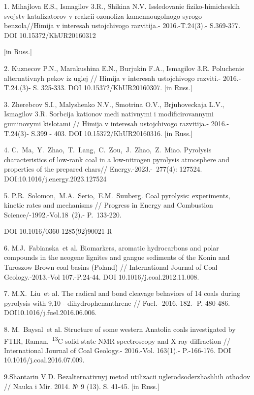 \begin{noparindent}
1. Mihajlova E.S., Ismagilov 3.R., Shikina N.V. Issledovanie
fiziko-himicheskih svojstv katalizatorov v reakcii ozonoliza
kamennougol\textquotesingle nogo syrogo benzola//Himija v interesah
ustojchivogo razvitija.- 2016.-T.24(3).- S.369-377. DOI
10.15372/KhUR20160312

{[}in Russ.{]}

2. Kuznecov P.N., Marakushina E.N., Burjukin F.A., Ismagilov 3.R.
Poluchenie al\textquotesingle ternativnyh pekov iz uglej // Himija v
interesah ustojchivogo razviti.- 2016.-T.24.(3)- S. 325-333. DOI
10.15372/KhUR20160307. {[}in Russ.{]}

3. Zherebcov S.I., Malyshenko N.V., Smotrina O.V., Brjuhoveckaja L.V.,
Ismagilov 3.R. Sorbcija kationov medi nativnymi i modificirovannymi
guminovymi kislotami // Himija v interesah ustojchivogo razvitija.-
2016.-T.24(3)- S.399 - 403. DOI 10.15372/KhUR20160316. {[}in Russ.{]}

4. C.~Ma,~Y.~Zhao,~T.~Lang,~C.~Zou,~J.~Zhao,~Z.~Miao. Pyrolysis
characteristics of low-rank coal in a low-nitrogen pyrolysis atmosphere
and properties of the prepared chars// Energy.-2023.-~277(4): 127524.
DOI:10.1016/j.energy.2023.127524

5. P.R.~Solomon,~M.A.~Serio,~E.M.~Suuberg. Coal pyrolysis: experiments,
kinetic rates and mechanisms // Progress in Energy and Combustion
Science/-1992.-Vol.18~(2).- P.~133-220.

DOI 10.1016/0360-1285(92)90021-R

6. M.J.~Fabianska\emph{~}et al. Biomarkers, aromatic hydrocarbons and
polar compounds in the neogene lignites and gangue sediments of the
Konin and Turoszow Brown coal basins (Poland) // International Journal
of Coal Geology.-2013.-Vol 107.-P.24-44. DOI 10.1016/j.coal.2012.11.008.

7. M.X.~Liu\emph{~}et al. The radical and bond cleavage behaviors of 14
coals during pyrolysis with 9,10 - dihydrophenanthrene // Fuel.-
2016.-182.- P. 480-486. DOI10.1016/j.fuel.2016.06.006.

8. M.~Baysal\emph{~}et al. Structure of some western Anatolia coals
investigated by FTIR, Raman,~\textsuperscript{13}C solid state NMR
spectroscopy and X-ray diffraction // International Journal of Coal
Geology.- 2016.-Vol. 163(1).- P.-166-176. DOI
10.1016/j.coal.2016.07.009.

9.Shantarin V.D. Bezal\textquotesingle ternativnyj metod utilizacii
uglerodsoderzhashhih othodov // Nauka i Mir. 2014. № 9 (13). S. 41-45.
{[}in Russ.{]}


\end{noparindent}
